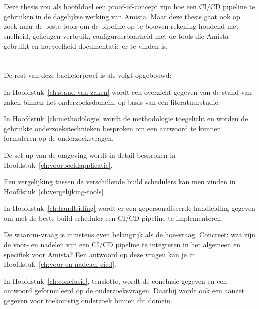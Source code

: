 \section{}
\label{sec:onderzoeksdoelstelling}

Deze thesis zou als hoofddoel een proof-of-concept zijn hoe een CI/CD pipeline te gebruiken in de dagelijkse werking van Amista. 
Maar deze thesis gaat ook op zoek naar de beste tools om de pipeline op te bouwen rekening houdend met snelheid, geheugen-verbruik, configureerbaarheid met de tools die Amista gebruikt en hoeveelheid documentatie er te vinden is.

\section{}
\label{sec:opzet-bachelorproef}


De rest van deze bachelorproef is als volgt opgebouwd:

In Hoofdstuk~\ref{ch:stand-van-zaken} wordt een overzicht gegeven van de stand van zaken binnen het onderzoeksdomein, op basis van een literatuurstudie.

In Hoofdstuk~\ref{ch:methodologie} wordt de methodologie toegelicht en worden de gebruikte onderzoekstechnieken besproken om een antwoord te kunnen formuleren op de onderzoeksvragen.

De set-up van de omgeving wordt in detail besproken in Hoofdstuk~\ref{ch:voorbeeldapplicatie}.

Een vergelijking tussen de verschillende build schedulers kan men vinden in Hoofdstuk~\ref{ch:vergelijking-tools}

In Hoofdstuk~\ref{ch:handleiding} wordt er een gepersonaliseerde handleiding gegeven om met de beste build scheduler een CI/CD pipeline te implementeren.

De waarom-vraag is minstens even belangrijk als de hoe-vraag. Concreet: wat zijn de voor- en nadelen van een CI/CD pipeline te integreren in het algemeen en specifiek voor Amista? Een antwoord op deze vragen kan je in Hoofdstuk~\ref{ch:voor-en-nadelen-cicd}.

In Hoofdstuk~\ref{ch:conclusie}, tenslotte, wordt de conclusie gegeven en een antwoord geformuleerd op de onderzoeksvragen. Daarbij wordt ook een aanzet gegeven voor toekomstig onderzoek binnen dit domein.